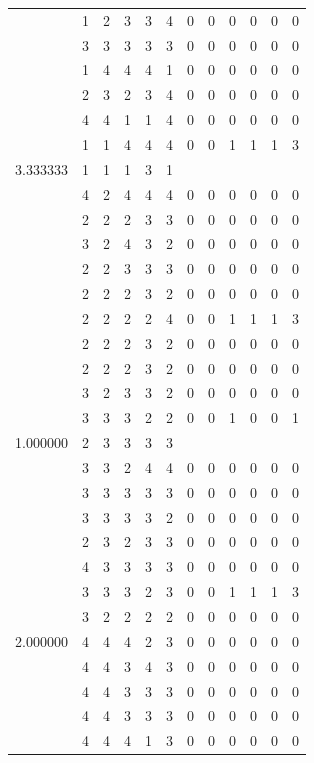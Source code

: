 \documentclass[]{book}
\theoremstyle{definition}
\theoremstyle{definition}
\theoremstyle{definition}
\theoremstyle{remark}
\begin{document}
\begin{table}
{\begin{tabular}[t]{rrrrrrrrrrrr}
 & 1 & 2 & 3 & 3 & 4 & 0 & 0 & 0 & 0 & 0 & 0\\
 & 3 & 3 & 3 & 3 & 3 & 0 & 0 & 0 & 0 & 0 & 0\\
 & 1 & 4 & 4 & 4 & 1 & 0 & 0 & 0 & 0 & 0 & 0\\
 & 2 & 3 & 2 & 3 & 4 & 0 & 0 & 0 & 0 & 0 & 0\\
 & 4 & 4 & 1 & 1 & 4 & 0 & 0 & 0 & 0 & 0 & 0\\
 & 1 & 1 & 4 & 4 & 4 & 0 & 0 & 1 & 1 & 1 & 3\\
3.333333 & 1 & 1 & 1 & 3 & 1 &  &  &  &  &  & \\
 & 4 & 2 & 4 & 4 & 4 & 0 & 0 & 0 & 0 & 0 & 0\\
 & 2 & 2 & 2 & 3 & 3 & 0 & 0 & 0 & 0 & 0 & 0\\
 & 3 & 2 & 4 & 3 & 2 & 0 & 0 & 0 & 0 & 0 & 0\\
 & 2 & 2 & 3 & 3 & 3 & 0 & 0 & 0 & 0 & 0 & 0\\
 & 2 & 2 & 2 & 3 & 2 & 0 & 0 & 0 & 0 & 0 & 0\\
 & 2 & 2 & 2 & 2 & 4 & 0 & 0 & 1 & 1 & 1 & 3\\
 & 2 & 2 & 2 & 3 & 2 & 0 & 0 & 0 & 0 & 0 & 0\\
 & 2 & 2 & 2 & 3 & 2 & 0 & 0 & 0 & 0 & 0 & 0\\
 & 3 & 2 & 3 & 3 & 2 & 0 & 0 & 0 & 0 & 0 & 0\\
 & 3 & 3 & 3 & 2 & 2 & 0 & 0 & 1 & 0 & 0 & 1\\
1.000000 & 2 & 3 & 3 & 3 & 3 &  &  &  &  &  & \\
 & 3 & 3 & 2 & 4 & 4 & 0 & 0 & 0 & 0 & 0 & 0\\
 & 3 & 3 & 3 & 3 & 3 & 0 & 0 & 0 & 0 & 0 & 0\\
 & 3 & 3 & 3 & 3 & 2 & 0 & 0 & 0 & 0 & 0 & 0\\
 & 2 & 3 & 2 & 3 & 3 & 0 & 0 & 0 & 0 & 0 & 0\\
 & 4 & 3 & 3 & 3 & 3 & 0 & 0 & 0 & 0 & 0 & 0\\
 & 3 & 3 & 3 & 2 & 3 & 0 & 0 & 1 & 1 & 1 & 3\\
 & 3 & 2 & 2 & 2 & 2 & 0 & 0 & 0 & 0 & 0 & 0\\
2.000000 & 4 & 4 & 4 & 2 & 3 & 0 & 0 & 0 & 0 & 0 & 0\\
 & 4 & 4 & 3 & 4 & 3 & 0 & 0 & 0 & 0 & 0 & 0\\
 & 4 & 4 & 3 & 3 & 3 & 0 & 0 & 0 & 0 & 0 & 0\\
 & 4 & 4 & 3 & 3 & 3 & 0 & 0 & 0 & 0 & 0 & 0\\
 & 4 & 4 & 4 & 1 & 3 & 0 & 0 & 0 & 0 & 0 & 0\\

\end{tabular}}
\end{table}
\end{document}
